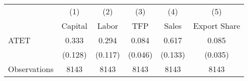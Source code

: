 \begin{tabular}{l*{5}{c}}
\hline\hline
                    &\multicolumn{1}{c}{(1)}&\multicolumn{1}{c}{(2)}&\multicolumn{1}{c}{(3)}&\multicolumn{1}{c}{(4)}&\multicolumn{1}{c}{(5)}\\
                    &\multicolumn{1}{c}{Capital}&\multicolumn{1}{c}{Labor}&\multicolumn{1}{c}{TFP}&\multicolumn{1}{c}{Sales}&\multicolumn{1}{c}{Export Share}\\
\hline
ATET                &       0.333&       0.294&       0.084&       0.617&       0.085\\
                    &     (0.128)&     (0.117)&     (0.046)&     (0.133)&     (0.035)\\
\hline
Observations        &        8143&        8143&        8143&        8143&        8143\\
\hline\hline
\end{tabular}
